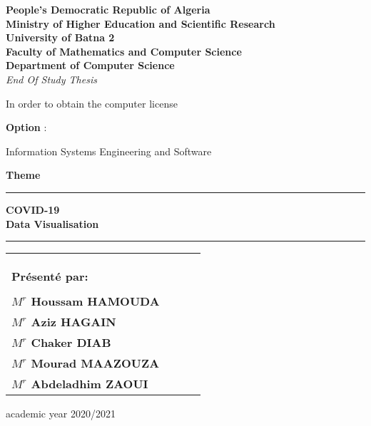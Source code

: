 \sloppy
\begin{titlepage}
\begin{center}
{\bf People's Democratic Republic of Algeria
\\Ministry of Higher Education and
Scientific Research} \vspace{0.25cm}\\
{\bf {\large University of Batna 2}}\\
{\bf Faculty of Mathematics and Computer Science} \\ {\bf Department of Computer Science}\\
\vspace{0.2cm}
\Huge{\emph{{{\it {End Of Study Thesis }}}}}\\
\vspace{0.1cm}
\normalsize
\begin{center}
In order to obtain the computer license\\

\end{center}
\normalsize\textbf{Option }:\\
\normalsize
\begin{center}
Information Systems Engineering and Software
\end{center}
\vspace{0.09cm}
\Huge\textbf{Theme}\\
\noindent\rule{\textwidth}{0.9mm}
\Large{{\textbf{COVID-19\\ Data Visualisation}}}
\noindent\rule{\textwidth}{0.9mm}
\end{center}
\begin{center}
\normalsize %
\begin{tabular}{llll}
\vspace{0.09cm}
\hspace{5.1cm}
\hspace{4.9cm} 
\\
\hspace{5.1cm}
\\\\
\textbf{Présenté par: \hspace{0cm}}~~~~~~~~~~~~\\\\
\textbf{\textbf{$M^{r}$ Houssam HAMOUDA }}\\
\textbf{\textbf{$M^{r}$ Aziz HAGAIN }}\\
\textbf{\textbf{$M^{r}$ Chaker DIAB }}\\
\textbf{\textbf{$M^{r}$ Mourad MAAZOUZA }}\\
\textbf{\textbf{$M^{r}$ Abdeladhim ZAOUI }}

\end{tabular}
\end{center}
\vspace{0.12cm}
\begin{center}
academic year 2020/2021
\end{center}
\end{titlepage}